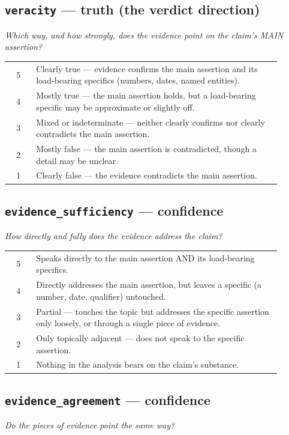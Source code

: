 \documentclass[11pt]{article}
\begin{document}
\subsection*{\texttt{veracity} --- truth (the verdict direction)}
\emph{Which way, and how strongly, does the evidence point on the claim's MAIN assertion?}

\begin{longtable}{@{}c>{\raggedright\arraybackslash}p{0.9\linewidth}@{}}
\toprule
5 & Clearly true --- evidence confirms the main assertion and its load-bearing specifics
(numbers, dates, named entities). \\
4 & Mostly true --- the main assertion holds, but a load-bearing specific may be approximate
or slightly off. \\
3 & Mixed or indeterminate --- neither clearly confirms nor clearly contradicts the main
assertion. \\
2 & Mostly false --- the main assertion is contradicted, though a detail may be unclear. \\
1 & Clearly false --- the evidence contradicts the main assertion. \\
\bottomrule
\end{longtable}

\subsection*{\texttt{evidence\_sufficiency} --- confidence}
\emph{How directly and fully does the evidence address the claim?}

\begin{longtable}{@{}c>{\raggedright\arraybackslash}p{0.9\linewidth}@{}}
\toprule
5 & Speaks directly to the main assertion AND its load-bearing specifics. \\
4 & Directly addresses the main assertion, but leaves a specific (a number, date, qualifier)
untouched. \\
3 & Partial --- touches the topic but addresses the specific assertion only loosely, or
through a single piece of evidence. \\
2 & Only topically adjacent --- does not speak to the specific assertion. \\
1 & Nothing in the analysis bears on the claim's substance. \\
\bottomrule
\end{longtable}

\subsection*{\texttt{evidence\_agreement} --- confidence}
\emph{Do the pieces of evidence point the same way?}
\end{document}
